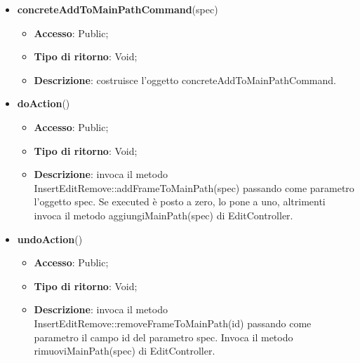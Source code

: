 {{{			
			\begin{itemize}
				\item \textbf{concreteAddToMainPathCommand}(spec)
				\begin{itemize}
					\item \textbf{Accesso}: Public;
					\item \textbf{Tipo di ritorno}: Void;
					\item \textbf{Descrizione}: costruisce l’oggetto concreteAddToMainPathCommand.
				\end{itemize}
				\item \textbf{doAction}()
				\begin{itemize}
					\item \textbf{Accesso}: Public;
					\item \textbf{Tipo di ritorno}: Void;
					\item \textbf{Descrizione}: invoca il metodo InsertEditRemove::addFrameToMainPath(spec) passando come parametro l'oggetto spec. Se executed è posto a zero, lo pone a uno, altrimenti invoca il metodo aggiungiMainPath(spec) di EditController.
				\end{itemize}
				\item \textbf{undoAction}()
				\begin{itemize}
					\item \textbf{Accesso}: Public;
					\item \textbf{Tipo di ritorno}: Void;
					\item \textbf{Descrizione}: invoca il metodo InsertEditRemove::removeFrameToMainPath(id) passando come parametro il campo id del parametro spec. Invoca il metodo rimuoviMainPath(spec) di EditController.
				\end{itemize}
			\end{itemize}
			}
			
}}
